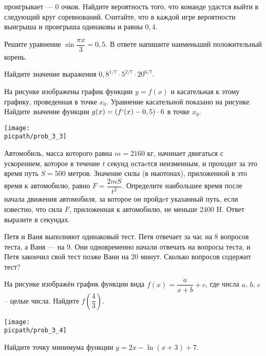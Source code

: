 \begin{class}[number=3]
\begin{listofex}
		проигрывает --- \( 0 \) очков.
		Найдите вероятность того, что команде удастся выйти в следующий круг
		соревнований.
		Считайте, что в каждой игре вероятности выигрыша и проигрыша одинаковы и равны \( 0,4 \).
		\foranswer
		\item Решите уравнение \( \sin \dfrac{\pi x}{3}=0,5 \). В ответе напишите наименьший положительный корень.
		\foranswer
		\item Найдите значение выражения \( 0,8^{1/7}\cdot5^{2/7}\cdot20^{6/7} \).
		\item
		\begin{minipage}[t]{\bodywidth}
			На рисунке изображены график функции \( y=f(x) \) и касательная к этому графику, проведенная в точке \( x_0 \). Уравнение касательной показано на рисунке. Найдите значение функции \( g(x)=(f`(x)-0,5)\cdot6 \) в точке \( x_0 \).
			\foranswer
		\end{minipage}
		\gapwidth
		\begin{minipage}[t]{\picwidth}
			\texttt{[image: \\picpath/prob\_3\_3]}
		\end{minipage}
	\item Автомобиль, масса которого равна \( m=2160 \) кг, начинает двигаться с ускорением, которое в
	течение \( t \) секунд остаeтся неизменным, и проходит за это время путь \( S=500 \) метров. Значение силы
	(в ньютонах), приложенной в это время к автомобилю, равно \( F=\dfrac{2mS}{t^2} \). Определите наибольшее
	время после начала движения автомобиля, за которое он пройдeт указанный путь, если известно, что
	сила \( F \), приложенная к автомобилю, не меньше \( 2400 \) H. Ответ выразите в секундах.
	\foranswer
	\item Петя и Ваня выполняют одинаковый тест. Петя отвечает за час на 8 вопросов теста, а Ваня —
	на 9. Они одновременно начали отвечать на вопросы теста, и Петя закончил свой тест позже Вани на
	20 минут. Сколько вопросов содержит тест?
	\foranswer
	\item
	\begin{minipage}[t]{\bodywidth}
		На рисунке изображён график функции вида \( f(x)=\dfrac{a}{x+b}+c \), где числа \( a \), \( b \), \( c \) -- целые числа. Найдите \( f\left( \dfrac{4}{3} \right) \).
		\foranswer
	\end{minipage}
	\gapwidth
	\begin{minipage}[t]{\picwidth}
		\texttt{[image: \\picpath/prob\_3\_4]}
	\end{minipage}
	\item Найдите точку минимума функции \( y=2x-\ln(x+3)+7 \).

\end{listofex}
\end{class}

